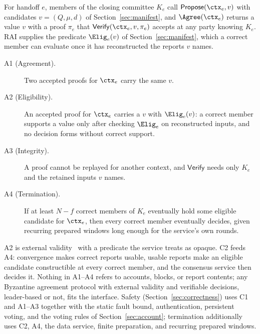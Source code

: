 For handoff $e$, members of the closing committee $K_e$ call $\mathsf{Propose}(\ctx_e,v)$ with candidates $v=(Q,\mu,d)$ of Section~\ref{sec:manifest}, and $\Agree(\ctx_e)$ returns a value $v$ with a proof $\pi_e$ that $\mathsf{Verify}(\ctx_e,v,\pi_e)$ accepts at any party knowing $K_e$. RAI supplies the predicate $\Elig_e(v)$ of Section~\ref{sec:manifest}, which a correct member can evaluate once it has reconstructed the reports $v$ names.
\begin{description}
\item[A1 (Agreement).] Two accepted proofs for $\ctx_e$ carry the same $v$.
\item[A2 (Eligibility).] An accepted proof for $\ctx_e$ carries a $v$ with $\Elig_e(v)$: a correct member supports a value only after checking $\Elig_e$ on reconstructed inputs, and no decision forms without correct support.
\item[A3 (Integrity).] A proof cannot be replayed for another context, and $\mathsf{Verify}$ needs only $K_e$ and the retained inputs $v$ names.
\item[A4 (Termination).] If at least $N-f$ correct members of $K_e$ eventually hold some eligible candidate for $\ctx_e$, then every correct member eventually decides, given recurring prepared windows long enough for the service's own rounds.
\end{description}
A2 is external validity~\cite{externalvalidity} with a predicate the service treats as opaque. C2 feeds A4: convergence makes correct reports usable, usable reports make an eligible candidate constructible at every correct member, and the consensus service then decides it. Nothing in A1--A4 refers to accounts, blocks, or report contents; any Byzantine agreement protocol with external validity and verifiable decisions, leader-based or not, fits the interface. Safety (Section~\ref{sec:correctness}) uses C1 and A1--A3 together with the static fault bound, authentication, persistent voting, and the voting rules of Section~\ref{sec:account}; termination additionally uses C2, A4, the data service, finite preparation, and recurring prepared windows.
